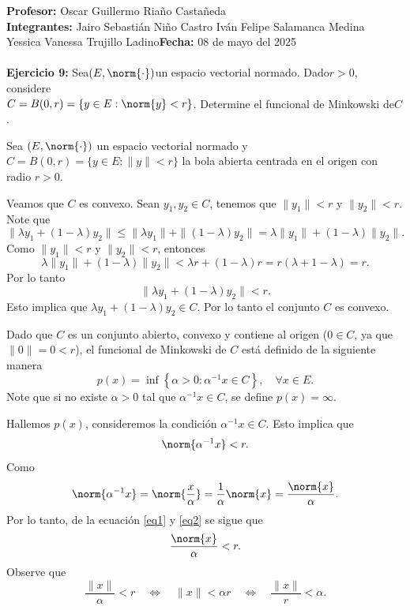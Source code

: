 \textbf{Profesor:} Oscar Guillermo Riaño Castañeda\\
\textbf{Integrantes:} Jairo Sebastián Niño Castro\hspace{2.8cm}
Iván Felipe Salamanca Medina\\
\hspace*{2.1cm} Yessica Vanessa Trujillo Ladino\hspace{2.25cm}\textbf{Fecha:} 08 de mayo del 2025\\
\vspace{0.25cm}\\
\textbf{Ejercicio 9:} Sea$(E, \norm{\cdot})$un espacio vectorial normado. Dado$r>0$, considere\\
$C=B(0,r)=\{y\in E:\norm{y}<r\}$. Determine el funcional de Minkowski de$C$.\\
\begin{solution}
Sea $(E, \norm{\cdot})$ un espacio vectorial normado y\\
$C = B(0,r) = \{ y \in E : \|y\| < r \}$ la bola abierta centrada en el origen con radio $r > 0$. 

Veamos que $C$ es convexo. Sean $y_1, y_2 \in C$, tenemos que $\|y_1\| < r$ y $\|y_2\| < r$. Note que
$$\|\lambda y_1 + (1 - \lambda) y_2\| \leq \|\lambda y_1\| + \|(1 - \lambda) y_2\| = \lambda \|y_1\| + (1 - \lambda) \|y_2\|.$$
Como $\|y_1\| < r$ y $\|y_2\| < r$, entonces
$$\lambda \|y_1\| + (1 - \lambda) \|y_2\| < \lambda r + (1 - \lambda) r = r (\lambda + 1 - \lambda) = r.$$
Por lo tanto
$$\|\lambda y_1 + (1 - \lambda) y_2\| < r.$$
Esto implica que $\lambda y_1 + (1 - \lambda) y_2 \in C$. Por lo tanto el conjunto $C$ es convexo.

Dado que $C$ es un conjunto abierto, convexo y contiene al origen ($0 \in C$, ya que \\
$\|0\| = 0 < r$), el funcional de Minkowski de $C$ está definido de la siguiente manera
$$p(x) = \inf \left\{ \alpha > 0 : \alpha^{-1} x \in C \right\}, \quad \forall x \in E.$$
Note que si no existe $\alpha> 0$ tal que $\alpha^{-1} x \in C$, se define $p(x) = \infty$.

Hallemos $p(x)$, consideremos la condición $\alpha^{-1} x \in C$. Esto implica que
\begin{equation}
    \norm{\alpha^{-1} x}< r.
    \label{eq1}
\end{equation}
Como
\begin{equation}
    \norm{\alpha^{-1} x}= \norm{\frac{x}{\alpha}} = \frac{1}{\alpha} \norm{x} = \frac{\norm{x}}{\alpha}.
    \label{eq2}
\end{equation}
Por lo tanto, de la ecuación \ref{eq1} y \ref{eq2} se sigue que
$$\frac{\norm{x}}{\alpha} < r.$$
Observe que
$$\frac{\|x\|}{\alpha} < r \quad \Leftrightarrow \quad \|x\| < \alpha r \quad \Leftrightarrow \quad \frac{\|x\|}{r}<\alpha.$$


\end{solution}
